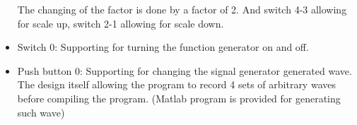 \documentclass[11pt]{scrartcl}
\begin{document}
\begin{itemize}
    The changing of the factor is done by a factor of 2. And switch 4-3 allowing for scale up, switch 2-1 allowing for scale down.
    
    \item Switch 0:
    Supporting for turning the function generator on and off.
    
    \item Push button 0:
    Supporting for changing the signal generator generated wave. The design itself allowing the program to record 4 sets of arbitrary waves before compiling the program. (Matlab program is provided for generating such wave) 
\end{itemize}
\end{document}
